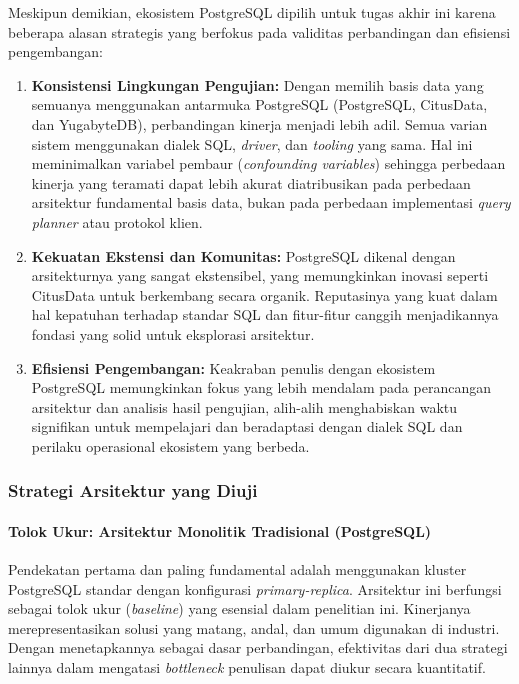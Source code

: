 Meskipun demikian, ekosistem PostgreSQL dipilih untuk tugas akhir ini karena beberapa alasan strategis yang berfokus pada validitas perbandingan dan efisiensi pengembangan:

\begin{enumerate}
    \item \textbf{Konsistensi Lingkungan Pengujian:} Dengan memilih basis data yang semuanya menggunakan antarmuka PostgreSQL (PostgreSQL, CitusData, dan YugabyteDB), perbandingan kinerja menjadi lebih adil. Semua varian sistem menggunakan dialek SQL, \textit{driver}, dan \textit{tooling} yang sama. Hal ini meminimalkan variabel pembaur (\textit{confounding variables}) sehingga perbedaan kinerja yang teramati dapat lebih akurat diatribusikan pada perbedaan arsitektur fundamental basis data, bukan pada perbedaan implementasi \textit{query planner} atau protokol klien.
    \item \textbf{Kekuatan Ekstensi dan Komunitas:} PostgreSQL dikenal dengan arsitekturnya yang sangat ekstensibel, yang memungkinkan inovasi seperti CitusData untuk berkembang secara organik. Reputasinya yang kuat dalam hal kepatuhan terhadap standar SQL dan fitur-fitur canggih menjadikannya fondasi yang solid untuk eksplorasi arsitektur.
    \item \textbf{Efisiensi Pengembangan:} Keakraban penulis dengan ekosistem PostgreSQL memungkinkan fokus yang lebih mendalam pada perancangan arsitektur dan analisis hasil pengujian, alih-alih menghabiskan waktu signifikan untuk mempelajari dan beradaptasi dengan dialek SQL dan perilaku operasional ekosistem yang berbeda.
\end{enumerate}

\subsubsection{Strategi Arsitektur yang Diuji}

\paragraph{Tolok Ukur: Arsitektur Monolitik Tradisional (PostgreSQL)}

Pendekatan pertama dan paling fundamental adalah menggunakan kluster PostgreSQL standar dengan konfigurasi \textit{primary-replica}. Arsitektur ini berfungsi sebagai tolok ukur (\textit{baseline}) yang esensial dalam penelitian ini. Kinerjanya merepresentasikan solusi yang matang, andal, dan umum digunakan di industri. Dengan menetapkannya sebagai dasar perbandingan, efektivitas dari dua strategi lainnya dalam mengatasi \textit{bottleneck} penulisan dapat diukur secara kuantitatif.

